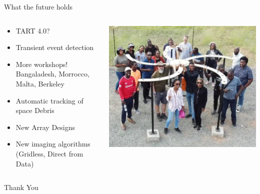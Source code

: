 \documentclass[ignorenonframetext]{beamer}
\begin{document}
\begin{frame}{What the future holds}
 \begin{columns}
  \begin{column}{0.6\linewidth}
    \begin{itemize}
    \item TART 4.0?
    \item Transient event detection
    \item More workshops! Bangaladesh, Morrocco, Malta, Berkeley
    \item Automatic tracking of space Debris
    \item New Array Designs
    \item New imaging algorithms (Gridless, Direct from Data)
    \end{itemize}
  \end{column}
  \begin{column}{0.4\linewidth}
    \includegraphics[width=\linewidth]{fig/biust_workshop.jpg}
  \end{column}
\end{columns}
    \pause
    \begin{block}{}
     \begin{center} Thank You \end{center}
    \end{block}

\end{frame}
\end{document}

